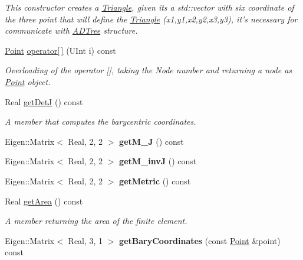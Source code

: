 \begin{DoxyCompactItemize}
\begin{DoxyCompactList}\small\item\em This constructor creates a \hyperlink{classTriangle}{Triangle}, given its a std::vector with six coordinate of the three point that will define the \hyperlink{classTriangle}{Triangle} (x1,y1,x2,y2,x3,y3), it's necessary for communicate with \hyperlink{classADTree}{ADTree} structure. \item\end{DoxyCompactList}\item 
\hyperlink{classPoint}{Point} \hyperlink{classTriangle_a4f2a08d6e79d0992cb23938d0fece62c}{operator\mbox{[}$\,$\mbox{]}} (UInt i) const 
\begin{DoxyCompactList}\small\item\em Overloading of the operator \mbox{[}\mbox{]}, taking the Node number and returning a node as \hyperlink{classPoint}{Point} object. \item\end{DoxyCompactList}\item 
Real \hyperlink{classTriangle_afd08dcbf5895b0c7cba20f296d40c068}{getDetJ} () const 
\begin{DoxyCompactList}\small\item\em A member that computes the barycentric coordinates. \item\end{DoxyCompactList}\item 
\hypertarget{classTriangle_abeb0bdaf6cebe42380bb80b8539a86d2}{
Eigen::Matrix$<$ Real, 2, 2 $>$ {\bfseries getM\_\-J} () const }
\label{classTriangle_abeb0bdaf6cebe42380bb80b8539a86d2}

\item 
\hypertarget{classTriangle_a93dd8dda1091b4e05d16da8d562bfcd0}{
Eigen::Matrix$<$ Real, 2, 2 $>$ {\bfseries getM\_\-invJ} () const }
\label{classTriangle_a93dd8dda1091b4e05d16da8d562bfcd0}

\item 
\hypertarget{classTriangle_acc9587525640ef364409f554a69aa3f7}{
Eigen::Matrix$<$ Real, 2, 2 $>$ {\bfseries getMetric} () const }
\label{classTriangle_acc9587525640ef364409f554a69aa3f7}

\item 
Real \hyperlink{classTriangle_a319c68c604089e6de23459d8c6d52f8a}{getArea} () const 
\begin{DoxyCompactList}\small\item\em A member returning the area of the finite element. \item\end{DoxyCompactList}\item 
\hypertarget{classTriangle_ae35c765865d38ad7323b5615cd9bbfe4}{
Eigen::Matrix$<$ Real, 3, 1 $>$ {\bfseries getBaryCoordinates} (const \hyperlink{classPoint}{Point} \&point) const }
\label{classTriangle_ae35c765865d38ad7323b5615cd9bbfe4}


\end{DoxyCompactItemize}
